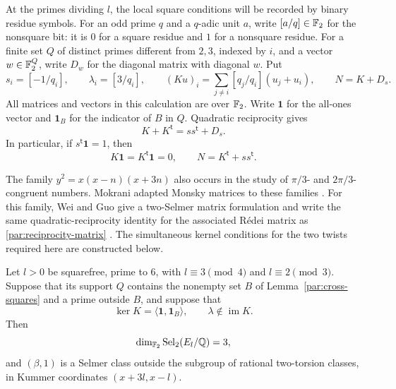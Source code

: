 At the primes dividing $l$, the local square conditions will be recorded
by binary residue symbols. For an odd prime $q$ and a $q$-adic unit $a$,
write $[a/q]\in\mathbb F_2$ for the nonsquare bit: it is $0$ for a square
residue and $1$ for a nonsquare residue. For a finite set $Q$ of distinct
primes different from $2,3$, indexed by $i$, and a vector $w\in\mathbb F_2^Q$,
write $D_w$ for the diagonal matrix with diagonal $w$. Put
\begin{equation}\label{par:matrices}
 s_i=[-1/q_i],\qquad \lambda_i=[3/q_i],\qquad
 (Ku)_i=\sum_{j\ne i}[q_j/q_i](u_j+u_i),\qquad N=K+D_s.
\end{equation}
All matrices and vectors in this calculation are over $\mathbb F_2$. Write
$\mathbf1$ for the all-ones vector and $\mathbf1_B$ for the indicator
of $B$ in $Q$. Quadratic reciprocity gives
\begin{equation}\label{par:reciprocity-matrix}
 K+K^{\mathsf t}=ss^{\mathsf t}+D_s.
\end{equation}
In particular, if $s^{\mathsf t}\mathbf1=1$, then
\begin{equation}\label{par:matrix-null-vectors}
 K\mathbf1=K^{\mathsf t}\mathbf1=0,
 \qquad N=K^{\mathsf t}+ss^{\mathsf t}.
\end{equation}

The family \(y^2=x(x-n)(x+3n)\) also occurs in the study of
\(\pi/3\)- and \(2\pi/3\)-congruent numbers.  Mokrani adapted
Monsky matrices to these families \cite{Mokrani2020}.  For this
family, Wei and Guo give a two-Selmer matrix formulation and write
the same quadratic-reciprocity identity for the associated R\'edei
matrix as \eqref{par:reciprocity-matrix}
\cite[Section~4 and Theorem~6.2]{WeiGuo2022}.  The simultaneous
kernel conditions for the two twists required here are constructed
below.

\begin{lemma}\label{par:descent}
Let $l>0$ be squarefree, prime to $6$, with
$l\equiv3\pmod4$ and $l\equiv2\pmod3$. Suppose that its support
$Q$ contains the nonempty set $B$ of Lemma~\ref{par:cross-squares}
and a prime outside $B$, and suppose that
\begin{equation}\label{par:matrix-target}
 \ker K=\langle\mathbf1,\mathbf1_B\rangle,
 \qquad \lambda\notin\operatorname{im}K.
\end{equation}
Then
\[
 \dim_{\mathbb F_2}\operatorname{Sel}_2(E_l/\mathbb Q)=3,
\]
and $(\beta,1)$ is a Selmer class outside the subgroup of rational
two-torsion classes, in Kummer coordinates $(x+3l,x-l)$.
\end{lemma}

